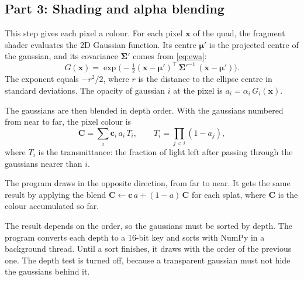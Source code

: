\documentclass[9pt,twocolumn,a4paper]{extarticle}
\newcommand{\Sig}{\symbf{\Sigma}}
\begin{document}
\subsection{Part 3: Shading and alpha blending}
\label{sec:blend}
This step gives each pixel a colour. For each pixel $\mathbf{x}$ of the quad, the fragment shader evaluates the 2D Gaussian function. Its centre $\symbf{\mu}'$ is the projected centre of the gaussian, and its covariance $\Sig'$ comes from \eqref{eq:ewa}:
\begin{equation}
G(\mathbf{x})=\exp\!\Big(-\tfrac12(\mathbf{x}-\symbf{\mu}')^{\top}\,\Sig'^{-1}\,(\mathbf{x}-\symbf{\mu}')\Big).
\label{eq:gauss}
\end{equation}
The exponent equals $-r^2/2$, where $r$ is the distance to the ellipse centre in standard deviations. The opacity of gaussian $i$ at the pixel is $a_i=\alpha_i\,G_i(\mathbf{x})$.

\par\noindent{}\par\vspace{3pt}

The gaussians are then blended in depth order. With the gaussians numbered from near to far, the pixel colour is
\begin{equation}
\mathbf{C}=\sum_{i}\mathbf{c}_i\,a_i\,T_i,\qquad
T_i=\prod_{j<i}(1-a_j),
\label{eq:over}
\end{equation}
where $T_i$ is the transmittance: the fraction of light left after passing through the gaussians nearer than $i$.

The program draws in the opposite direction, from far to near. It gets the same result by applying the blend $\mathbf{C}\leftarrow\mathbf{c}\,a+(1-a)\,\mathbf{C}$ for each splat, where $\mathbf{C}$ is the colour accumulated so far.

The result depends on the order, so the gaussians must be sorted by depth. The program converts each depth to a 16-bit key and sorts with NumPy in a background thread. Until a sort finishes, it draws with the order of the previous one. The depth test is turned off, because a transparent gaussian must not hide the gaussians behind it.

\par\noindent{}\par\vspace{3pt}
\end{document}
